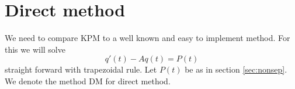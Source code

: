 \section{Direct method} \label{sec:DM}
We need to compare KPM to a well known and easy to implement method. For this we will solve 
\begin{equation} \label{eqn:DI}
q'(t) -A q(t) = P(t)
\end{equation}
straight forward with trapezoidal rule. Let $P(t)$ be as in section \ref{sec:nonsep}. We denote the method DM for direct method.
